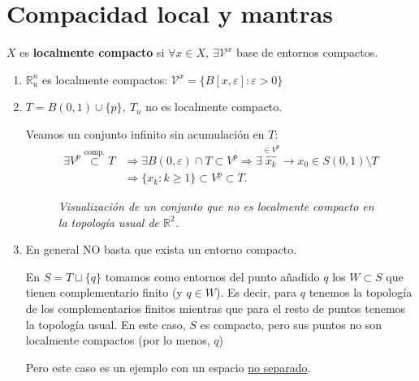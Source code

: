 
\section{Compacidad local y mantras}%
\label{sec:compacidad_local_y_mantras}
\begin{defi}
$X$ es \textbf{localmente compacto} si $\forall x \in X,\ \exists \mathcal{V}^x$ base de entornos compactos.
\end{defi}

\begin{ej}
\begin{enumerate}
    \item $\mathbb{R}_u^n$ es localmente compactos: $\mathcal{V}^x = \{B\left[ x, \varepsilon \right] : \varepsilon > 0\}$

    \item $T = B\left( 0, 1 \right) \cup \{p\},\ T_u$ no es localmente compacto.
    \begin{demo}
    Veamos un conjunto infinito sin acumulación en $T$:
    \begin{align*}
        \exists V^p \stackrel{\text{comp.}}{\subset} T &\Rightarrow \exists B\left( 0, \varepsilon \right) \cap T \subset V^p \Rightarrow \exists \overbrace{x_k}^{\in V^p} \rightarrow x_0 \in S\left( 0, 1 \right) \setminus T\\
       &\Rightarrow \{x_k : k \ge 1\} \subset V^p \subset T 
    .\end{align*}
    \end{demo}

    \begin{figure}[H]
        \centering
        \caption{\textit{Visualización de un conjunto que no es localmente compacto en la topología usual de $\mathbb{R}^2$.}}
        \label{fig:usual-no-localmente-compacto}
    \end{figure}

    \item En general NO basta que exista un entorno compacto.

    En $S = T \sqcup \{q\}$ tomamos como entornos del punto añadido $q$ los $W \subset S$ que tienen complementario finito (y $q \in W$). 
    Es decir, para $q$ tenemos la topología de los complementarios finitos mientras que para el resto de puntos tenemos la topología usual.
    En este caso, $S$ es compacto, pero sus puntos no son localmente compactos (por lo menos, $q$)

    Pero este caso es un ejemplo con un espacio \underline{no separado}.
\end{enumerate}
\end{ej}

